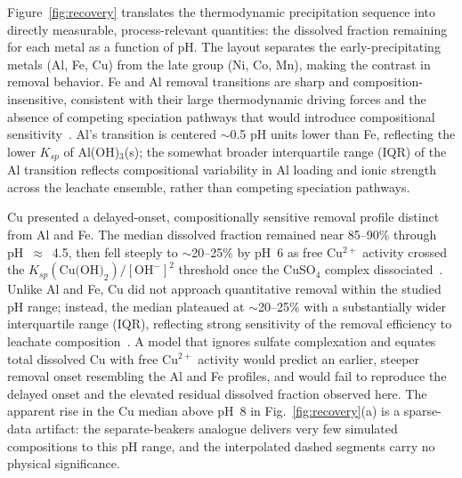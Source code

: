 \documentclass[final,2p,times]{elsarticle}
\begin{document}
Figure~\ref{fig:recovery} translates the thermodynamic precipitation sequence into directly measurable, process-relevant quantities: the dissolved fraction remaining for each metal as a function of pH. The layout separates the early-precipitating metals (Al, Fe, Cu) from the late group (Ni, Co, Mn), making the contrast in removal behavior. Fe and Al removal transitions are sharp and composition-insensitive, consistent with their large thermodynamic driving forces and the absence of competing speciation pathways that would introduce compositional sensitivity~\cite{stumm_aquatic_1996, may_gibbsite_1979}. Al's transition is centered $\sim$0.5 pH units lower than Fe, reflecting the lower $K_{sp}$ of Al(OH)$_3$(s); the somewhat broader interquartile range (IQR) of the Al transition reflects compositional variability in Al loading and ionic strength across the leachate ensemble, rather than competing speciation pathways.

Cu presented a delayed-onset, compositionally sensitive removal profile distinct from Al and Fe. The median dissolved fraction remained near 85--90\% through pH~$\approx$~4.5, then fell steeply to $\sim$20--25\% by pH~6 as free Cu$^{2+}$ activity crossed the $K_{sp}(\text{Cu(OH)}_2)/[\text{OH}^-]^2$ threshold once the CuSO$_4$ complex dissociated~\cite{crundwell_extractive_2011, stumm_aquatic_1996}. Unlike Al and Fe, Cu did not approach quantitative removal within the studied pH range; instead, the median plateaued at $\sim$20--25\% with a substantially wider interquartile range (IQR), reflecting strong sensitivity of the removal efficiency to leachate composition~\cite{virolainen_removal_2017}. A model that ignores sulfate complexation and equates total dissolved Cu with free Cu$^{2+}$ activity would predict an earlier, steeper removal onset resembling the Al and Fe profiles, and would fail to reproduce the delayed onset and the elevated residual dissolved fraction observed here. The apparent rise in the Cu median above pH~8 in Fig.~\ref{fig:recovery}(a) is a sparse-data artifact: the separate-beakers analogue delivers very few simulated compositions to this pH range, and the interpolated dashed segments carry no physical significance.
\end{document}
